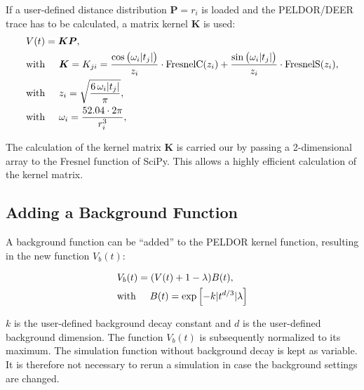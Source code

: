 \documentclass[pdftex,bezier,german,a4,twoside, headexclude,12pt,nochapterprefix, titlepage]{extarticle}
\begin{document}
If a user-defined distance distribution $\boldsymbol{P} = r_{i}$ is loaded and the PELDOR/DEER trace has to be calculated, a matrix kernel $\boldsymbol{K}$ is used:
%
\begin{align}
\begin{split}
&V(t) = \boldsymbol{K}\boldsymbol{P},\\
&\mbox{with}\hspace{0.5cm} \boldsymbol{K} = K_{ji} =
\frac{\cos{\big(\omega_{i}|t_j| \big)}}{z_{i}} \cdot \text{FresnelC}(z_{i})  + 
   \frac{\sin{\big(\omega_{i} |t_j|\big)}}{z_{i}} \cdot \text{FresnelS}(z_{i}),\\
  &\mbox{with}\hspace{0.5cm}  z_{i} = \sqrt{\frac{6\,\omega_{i} |t_j| }{\pi}},\\
&\mbox{with}\hspace{0.5cm} \omega_{i} = \dfrac{52.04\cdot 2 \pi}{r_{i}^3},\\ 
\label{kernel_matrix_cal}
\end{split}
\end{align}

The calculation of the kernel matrix $\boldsymbol{K}$ is carried our by passing a 2-dimensional array to the Fresnel function of SciPy. This allows a highly efficient calculation of the kernel matrix.


\subsection{Adding a Background Function}

A background function can be ``added'' to the PELDOR kernel function, resulting in the new function $V_{b}(t)$: 

\begin{align}
\begin{split}
&V_{b}(t) = (V(t)+1-\lambda)B(t), \\
&\mbox{with}\hspace{0.5cm}B(t) = \mathrm{exp}\left[-k|t^{d/3}|\lambda \right]
\label{background_function}
\end{split}
\end{align}

$k$ is the user-defined background decay constant and $d$ is the user-defined background dimension. The 
function $V_{b}(t)$ is subsequently normalized to its maximum.
The simulation function without background decay is kept as variable. It is therefore not necessary to rerun a simulation in 
case the background settings are changed.
\end{document}
